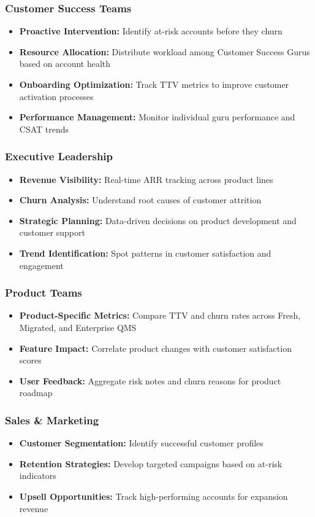 \documentclass[12pt,a4paper]{article}
\begin{document}
\subsubsection{Customer Success Teams}
\begin{itemize}
    \item \textbf{Proactive Intervention:} Identify at-risk accounts before they churn
    \item \textbf{Resource Allocation:} Distribute workload among Customer Success Gurus based on account health
    \item \textbf{Onboarding Optimization:} Track TTV metrics to improve customer activation processes
    \item \textbf{Performance Management:} Monitor individual guru performance and CSAT trends
\end{itemize}

\subsubsection{Executive Leadership}
\begin{itemize}
    \item \textbf{Revenue Visibility:} Real-time ARR tracking across product lines
    \item \textbf{Churn Analysis:} Understand root causes of customer attrition
    \item \textbf{Strategic Planning:} Data-driven decisions on product development and customer support
    \item \textbf{Trend Identification:} Spot patterns in customer satisfaction and engagement
\end{itemize}

\subsubsection{Product Teams}
\begin{itemize}
    \item \textbf{Product-Specific Metrics:} Compare TTV and churn rates across Fresh, Migrated, and Enterprise QMS
    \item \textbf{Feature Impact:} Correlate product changes with customer satisfaction scores
    \item \textbf{User Feedback:} Aggregate risk notes and churn reasons for product roadmap
\end{itemize}

\subsubsection{Sales \& Marketing}
\begin{itemize}
    \item \textbf{Customer Segmentation:} Identify successful customer profiles
    \item \textbf{Retention Strategies:} Develop targeted campaigns based on at-risk indicators
    \item \textbf{Upsell Opportunities:} Track high-performing accounts for expansion revenue
\end{itemize}
\end{document}
